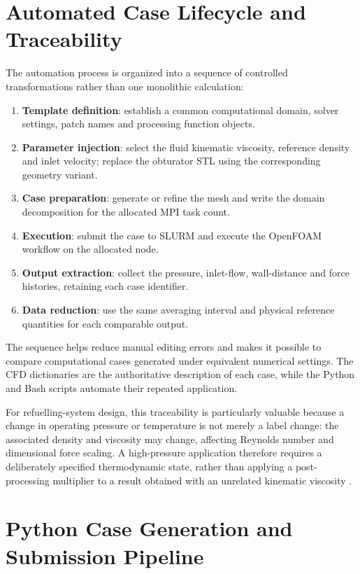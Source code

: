 \section{Automated Case Lifecycle and Traceability}
\label{sec:case_lifecycle}

The automation process is organized into a sequence of controlled transformations rather than one monolithic calculation:
\begin{enumerate}
\item \textbf{Template definition}: establish a common computational domain, solver settings, patch names and processing function objects.
\item \textbf{Parameter injection}: select the fluid kinematic viscosity, reference density and inlet velocity; replace the obturator STL using the corresponding geometry variant.
\item \textbf{Case preparation}: generate or refine the mesh and write the domain decomposition for the allocated MPI task count.
\item \textbf{Execution}: submit the case to SLURM and execute the OpenFOAM workflow on the allocated node.
\item \textbf{Output extraction}: collect the pressure, inlet-flow, wall-distance and force histories, retaining each case identifier.
\item \textbf{Data reduction}: use the same averaging interval and physical reference quantities for each comparable output.
\end{enumerate}
The sequence helps reduce manual editing errors and makes it possible to compare computational cases generated under equivalent numerical settings. The CFD dictionaries are the authoritative description of each case, while the Python and Bash scripts automate their repeated application.

For refuelling-system design, this traceability is particularly valuable because a change in operating pressure or temperature is not merely a label change: the associated density and viscosity may change, affecting Reynolds number and dimensional force scaling. A high-pressure application therefore requires a deliberately specified thermodynamic state, rather than applying a post-processing multiplier to a result obtained with an unrelated kinematic viscosity \cite{nist_refprop,white2016}.

\section{Python Case Generation and Submission Pipeline}
\label{sec:python_doe_generator}

